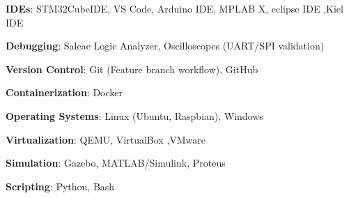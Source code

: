 \begin{cvitems}
  \vspace{1.7mm}
  \item \textbf{IDEs}: STM32CubeIDE, VS Code, Arduino IDE, MPLAB X, eclipse IDE ,Kiel IDE
  \item \textbf{Debugging}: Saleae Logic Analyzer, Oscilloscopes (UART/SPI validation)
  \item \textbf{Version Control}: Git (Feature branch workflow), GitHub
  \item \textbf{Containerization}: Docker
  \item \textbf{Operating Systems}: Linux (Ubuntu, Raspbian), Windows
  \item \textbf{Virtualization}: QEMU, VirtualBox ,VMware 
  \item \textbf{Simulation}: Gazebo, MATLAB/Simulink, Proteus
  \item \textbf{Scripting}: Python, Bash
  \vspace{0.5mm}
\end{cvitems}